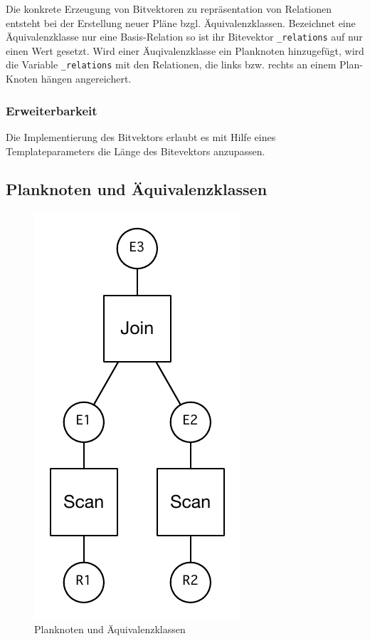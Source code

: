 Die konkrete Erzeugung von Bitvektoren zu repräsentation von Relationen entsteht bei der Erstellung neuer Pläne bzgl. Äquivalenzklassen. Bezeichnet eine Äquivalenzklasse nur eine Basis-Relation so ist ihr Bitevektor \texttt{\_relations} auf nur einen Wert gesetzt. Wird einer Äuqivalenzklasse ein Planknoten hinzugefügt, wird die Variable \texttt{\_relations} mit den Relationen, die links bzw. rechts an einem Plan-Knoten hängen angereichert.



\subsubsection{Erweiterbarkeit}
Die Implementierung des Bitvektors erlaubt es mit Hilfe eines Templateparameters die Länge des Bitevektors anzupassen.



\subsection{Planknoten und Äquivalenzklassen}




\begin{figure}[ht]
  \centering
  \includegraphics{04_Implementierung/00_media/JoinScan.pdf}
  \caption{Planknoten und Äquivalenzklassen}
  \label{PlanAequi}
\end{figure}

